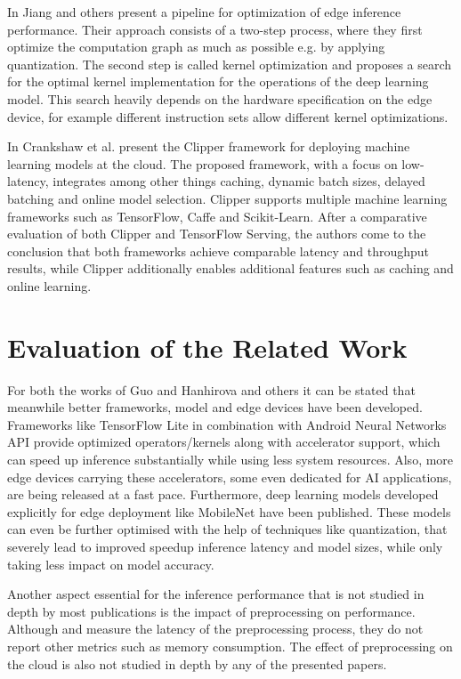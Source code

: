 In \cite{jiang2018efficient} Jiang and others present a pipeline for optimization of edge inference performance.
Their approach consists of a two-step process, where they first optimize the computation graph as much as possible e.g. by applying quantization.
The second step is called kernel optimization and proposes a search for the optimal kernel implementation for the operations of the deep learning model.
This search heavily depends on the hardware specification on the edge device, for example different instruction sets allow different kernel optimizations.

In \cite{201468} Crankshaw et al. present the Clipper framework for deploying machine learning models at the cloud.
The proposed framework, with a focus on low-latency, integrates among other things caching, dynamic batch sizes, delayed batching and online model selection.
Clipper supports multiple machine learning frameworks such as TensorFlow, Caffe and Scikit-Learn.
After a comparative evaluation of both Clipper and TensorFlow Serving, the authors come to the conclusion that both frameworks achieve comparable latency and throughput results, while Clipper additionally enables additional features such as caching and online learning.

\section{Evaluation of the Related Work}
For both the works of Guo\cite{DBLP:conf/ic2e/Guo18} and Hanhirova and others\cite{DBLP:conf/mmsys/HanhirovaKSSHY18} it can be stated that meanwhile better frameworks, model and edge devices have been developed.
Frameworks like TensorFlow Lite in combination with Android Neural Networks API provide optimized operators/kernels along with accelerator support, which can speed up inference substantially while using less system resources.
Also, more edge devices carrying these accelerators, some even dedicated for AI applications, are being released at a fast pace.
Furthermore, deep learning models developed explicitly for edge deployment like MobileNet have been published. These models can even be further optimised with the help of techniques like quantization, that severely lead to improved speedup inference latency and model sizes, while only taking less impact on model accuracy.

Another aspect essential for the inference performance that is not studied in depth by most publications is the impact of preprocessing on performance.
Although \cite{DBLP:conf/ic2e/Guo18} and \cite{DBLP:conf/mmsys/HanhirovaKSSHY18} measure the latency of the preprocessing process, they do not report other metrics such as memory consumption. The effect of preprocessing on the cloud is also not studied in depth by any of the presented papers.


